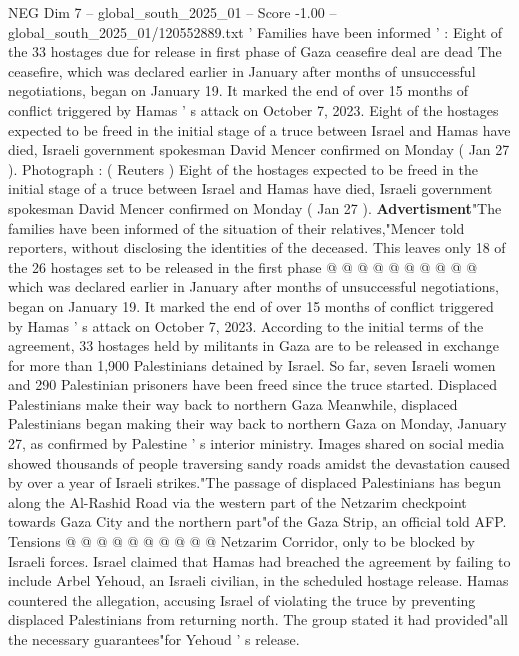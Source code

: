 \begin{textsample}{NEG Dim 7 – global\_south\_2025\_01 – Score -1.00 – global\_south\_2025\_01/120552889.txt}  \label{ex:f7_neg_119}
' Families have been informed ' : Eight of the 33 hostages due for release in first phase of Gaza ceasefire deal are dead The ceasefire, which was declared earlier in January after months of unsuccessful negotiations, began on January 19.
It marked the end of over 15 months of conflict triggered by Hamas ' s attack on October 7, 2023.
Eight of the hostages expected to be freed in the initial stage of a truce between Israel and Hamas have died, Israeli government spokesman David Mencer confirmed on Monday ( Jan 27 ).
Photograph : ( Reuters ) Eight of the hostages expected to be freed in the initial stage of a truce between Israel and Hamas have died, Israeli government spokesman David Mencer confirmed on Monday ( Jan 27 ). \textbf{Advertisment}"The families have been informed of the situation of their relatives,"Mencer told reporters, without disclosing the identities of the deceased.
This leaves only 18 of the 26 hostages set to be released in the first phase @ @ @ @ @ @ @ @ @ @ which was declared earlier in January after months of unsuccessful negotiations, began on January 19.
It marked the end of over 15 months of conflict triggered by Hamas ' s attack on October 7, 2023.
According to the initial terms of the agreement, 33 hostages held by militants in Gaza are to be released in exchange for more than 1,900 Palestinians detained by Israel.
So far, seven Israeli women and 290 Palestinian prisoners have been freed since the truce started.
Displaced Palestinians make their way back to northern Gaza Meanwhile, displaced Palestinians began making their way back to northern Gaza on Monday, January 27, as confirmed by Palestine ' s interior ministry.
Images shared on social media showed thousands of people traversing sandy roads amidst the devastation caused by over a year of Israeli strikes."The passage of displaced Palestinians has begun along the Al-Rashid Road via the western part of the Netzarim checkpoint towards Gaza City and the northern part"of the Gaza Strip, an official told AFP.
Tensions @ @ @ @ @ @ @ @ @ @ Netzarim Corridor, only to be blocked by Israeli forces.
Israel claimed that Hamas had breached the agreement by failing to include Arbel Yehoud, an Israeli civilian, in the scheduled hostage release.
Hamas countered the allegation, accusing Israel of violating the truce by preventing displaced Palestinians from returning north.
The group stated it had provided"all the necessary guarantees"for Yehoud ' s release.

\end{textsample}
